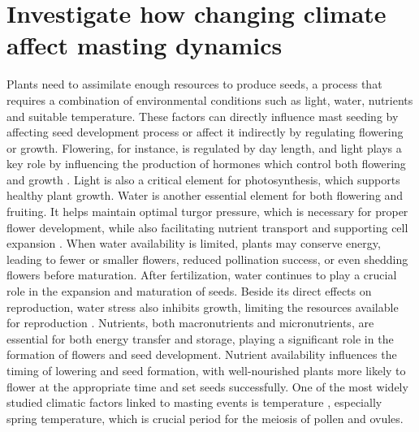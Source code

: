\documentclass[11pt,letter]{article}
\begin{document}
\section{Investigate how changing climate affect masting dynamics}
Plants need to assimilate enough resources to produce seeds, a process that requires a combination of environmental conditions such as light, water, nutrients and suitable temperature. These factors can directly influence mast seeding by affecting seed development process or affect it indirectly by regulating flowering or growth. Flowering, for instance, is regulated by day length, and light plays a key role by influencing the production of hormones which control both flowering and growth \citep{lau2010plant}. Light is also a critical element for photosynthesis, which supports healthy plant growth. Water is another essential element for both flowering and fruiting. It helps maintain optimal turgor pressure, which is necessary for proper flower development, while also facilitating nutrient transport and supporting cell expansion \citep{taiz2002plant}. When water availability is limited, plants may conserve energy, leading to fewer or smaller flowers, reduced pollination success, or even shedding flowers before maturation. After fertilization, water continues to play a crucial role in the expansion and maturation of seeds. Beside its direct effects on reproduction, water stress also inhibits growth, limiting the resources available for reproduction \citep{hsiao1973plant, anjum2011morphological}. Nutrients, both macronutrients and micronutrients, are essential for both energy transfer and storage, playing a significant role in the formation of flowers and seed development. Nutrient availability influences the timing of lowering and seed formation, with well-nourished plants more likely to flower at the appropriate time and set seeds successfully. One of the most widely studied climatic factors linked to masting events is temperature \citep{bajocco2021characterizing, moreira2015effects, schauber2002masting, bogdziewicz2024evolutionary}, especially spring temperature, which is crucial period for the meiosis of pollen and ovules.\par
\end{document}
